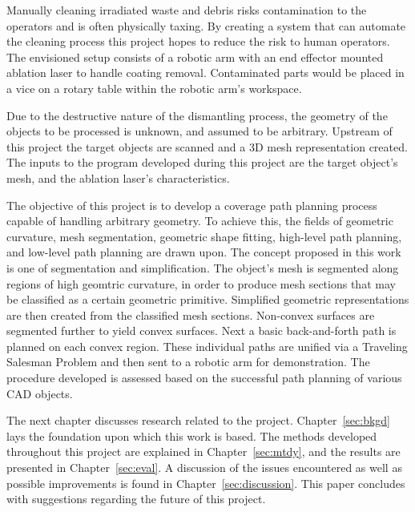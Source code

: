 Manually cleaning irradiated waste and debris risks contamination to the operators and is often physically taxing.
By creating a system that can automate the cleaning process this project hopes to reduce the risk to human operators.
The envisioned setup consists of a robotic arm with an end effector mounted ablation laser to handle coating removal.
Contaminated parts would be placed in a vice on a rotary table within the robotic arm's workspace.

Due to the destructive nature of the dismantling process, the geometry of the objects to be processed is unknown, and assumed to be arbitrary.
Upstream of this project the target objects are scanned and a 3D mesh representation created.
The inputs to the program developed during this project are the target object's mesh, and the ablation laser's characteristics.

The objective of this project is to develop a coverage path planning process capable of handling arbitrary geometry.
To achieve this, the fields of geometric curvature, mesh segmentation, geometric shape fitting, high-level path planning, and low-level path planning are drawn upon.
The concept proposed in this work is one of segmentation and simplification.
The object's mesh is segmented along regions of high geomtric curvature, in order to produce mesh sections that may be classified as a certain geometric primitive.
Simplified geometric representations are then created from the classified mesh sections.
Non-convex surfaces are segmented further to yield convex surfaces.
Next a basic back-and-forth path is planned on each convex region.
These individual paths are unified via a Traveling Salesman Problem and then sent to a robotic arm for demonstration.
The procedure developed is assessed based on the successful path planning of various CAD objects.


The next chapter discusses research related to the project.
Chapter~\ref{sec:bkgd} lays the foundation upon which this work is based.
The methods developed throughout this project are explained in Chapter~\ref{sec:mtdy}, and the results are presented in Chapter~\ref{sec:eval}.
A discussion of the issues encountered as well as possible improvements is found in Chapter~\ref{sec:discussion}.
This paper concludes with suggestions regarding the future of this project.

